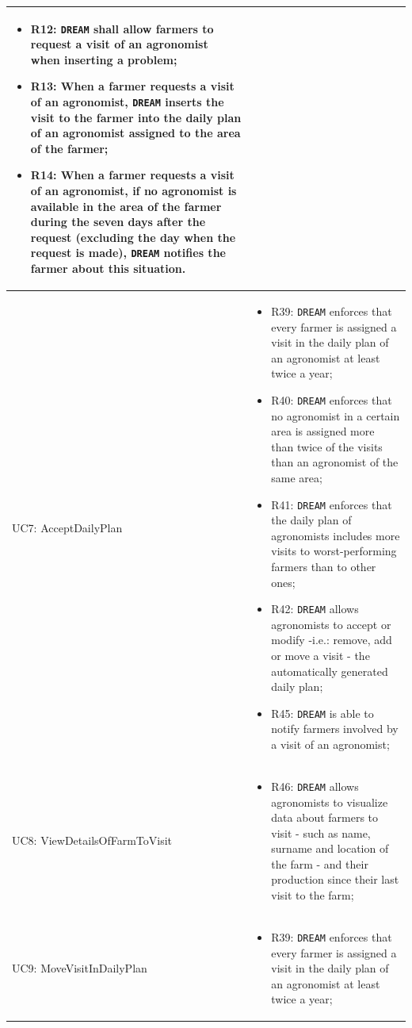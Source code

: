\documentclass{article}
\begin{document}
\begin{longtable}[c]{|m{}|m{8cm}|}
\begin{itemize}
  \item R12: \verb|DREAM| shall allow farmers to request a visit of an agronomist when inserting a problem;

  \item R13: When a farmer requests a visit of an agronomist, \verb|DREAM| inserts the visit to the farmer into the daily plan of an agronomist assigned to the area of the farmer;

  \item R14: When a farmer requests a visit of an agronomist, if no agronomist is available in the area of the farmer during the seven days after the request (excluding the day when the request is made), \verb|DREAM| notifies the farmer about this situation.
    \end{itemize}\\
\hline
UC7: AcceptDailyPlan & 
\begin{itemize}
    \item R39: \verb|DREAM| enforces that every farmer is assigned a visit in the daily plan of an agronomist at least twice a year;

    \item R40: \verb|DREAM| enforces that no agronomist in a certain area is assigned more than twice of the visits than an agronomist of the same area;

    \item R41: \verb|DREAM| enforces that the daily plan of agronomists includes more visits to worst-performing farmers than to other ones;

    \item R42: \verb|DREAM| allows agronomists to accept or modify -i.e.: remove, add or move a visit - the automatically generated daily plan;

    \item R45: \verb|DREAM| is able to notify farmers involved by a visit of an agronomist;
\end{itemize}\\ \hline
\hline
UC8: ViewDetailsOfFarmToVisit & 
\begin{itemize}
    \item R46: \verb|DREAM| allows agronomists to visualize data about farmers to visit - such as name, surname and location of the farm -  and their production since their last visit to the farm;
\end{itemize}\\
\hline
UC9: MoveVisitInDailyPlan & 
\begin{itemize}
    \item R39: \verb|DREAM| enforces that every farmer is assigned a visit in the daily plan of an agronomist at least twice a year;


\end{itemize}
\end{longtable}
\end{document}
